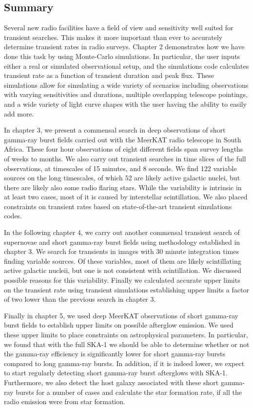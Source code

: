 \documentclass[12pt]{article}
\begin{document}
\subsection{Summary}
Several new radio facilities have a field of view and sensitivity well suited for transient searches. This makes it more important than ever to accurately determine transient rates in radio surveys. Chapter 2 demonstrates how we have done this task by using Monte-Carlo simulations. In particular, the user inputs either a real or simulated observational setup, and the simulations code calculates transient rate as a function of transient duration and peak flux. These simulations allow for simulating a wide variety of scenarios including observations with varying sensitivities and durations, multiple overlapping telescope pointings, and a wide variety of light curve shapes with the user having the ability to easily add more. 

In chapter 3, we present a commensal search in deep observations of short gamma-ray burst fields carried out with the MeerKAT radio telescope in South Africa. These four hour observations of eight different fields span survey lengths of weeks to months. We also carry out transient searches in time slices of the full observations, at timescales of 15 minutes, and 8 seconds. We find 122 variable sources on the long timescales, of which 52 are likely active galactic nuclei, but there are likely also some radio flaring stars. While the variability is intrinsic in at least two cases, most of it is caused by interstellar scintillation. We also placed constraints on transient rates based on state-of-the-art transient simulations codes.

In the following chapter 4, we carry out another commensal transient search of supernovae and short gamma-ray burst fields using methodology established in chapter 3. We search for transients in images with 30 minute integration times finding variable sources. Of these variables, most of them are likely scintillating active galactic nucleii, but one is not consistent with scintillation. We discussed possible reasons for this variability. Finally we calculated accurate upper limits on the transient rate using transient simulations establishing upper limits a factor of two lower than the previous search in chapter 3. 

Finally in chapter 5, we used deep MeerKAT observations of short gamma-ray burst fields to establish upper limits on possible afterglow emission. We used these upper limits to place constraints on astrophysical parameters. In particular, we found that with the full SKA-1 we should be able to determine whether or not the gamma-ray efficiency is significantly lower for short gamma-ray bursts compared to long gamma-ray bursts. In addition, if it is indeed lower, we expect to start regularly detecting short gamma-ray burst afterglows with SKA-1. Furthermore, we also detect the host galaxy associated with these short gamma-ray bursts for a number of cases and calculate the star formation rate, if all the radio emission were from star formation. 
\end{document}
